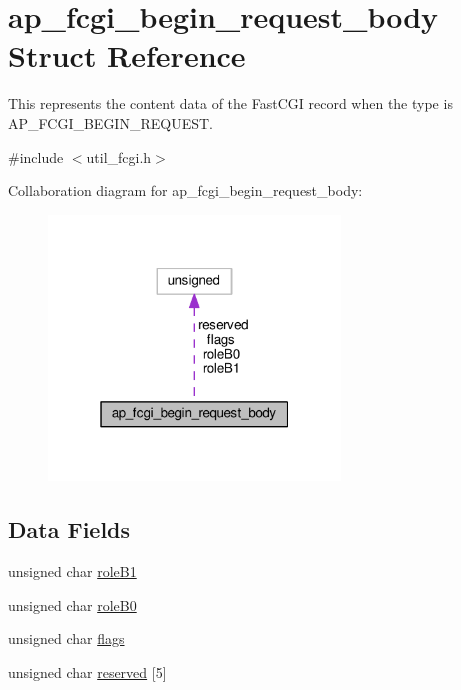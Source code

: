 \hypertarget{structap__fcgi__begin__request__body}{}\section{ap\+\_\+fcgi\+\_\+begin\+\_\+request\+\_\+body Struct Reference}
\label{structap__fcgi__begin__request__body}


This represents the content data of the Fast\+C\+GI record when the type is A\+P\+\_\+\+F\+C\+G\+I\+\_\+\+B\+E\+G\+I\+N\+\_\+\+R\+E\+Q\+U\+E\+ST.  




{\ttfamily \#include $<$util\+\_\+fcgi.\+h$>$}



Collaboration diagram for ap\+\_\+fcgi\+\_\+begin\+\_\+request\+\_\+body\+:
\nopagebreak
\begin{figure}[H]
\begin{center}
\leavevmode
\includegraphics[width=220pt]{structap__fcgi__begin__request__body__coll__graph}
\end{center}
\end{figure}
\subsection*{Data Fields}
\begin{DoxyCompactItemize}
\item 
unsigned char \hyperlink{structap__fcgi__begin__request__body_ad3a706ede9a2f1780027a8b0cf30025e}{role\+B1}
\item 
unsigned char \hyperlink{structap__fcgi__begin__request__body_a89c56a6c47ab48884e0ed4f2a9a2f457}{role\+B0}
\item 
unsigned char \hyperlink{structap__fcgi__begin__request__body_a9198bcd21f9527acba43ee1fb146c258}{flags}
\item 
unsigned char \hyperlink{structap__fcgi__begin__request__body_aff94fc13a2fc93e3781c3ed60df2a357}{reserved} \mbox{[}5\mbox{]}
\end{DoxyCompactItemize}


